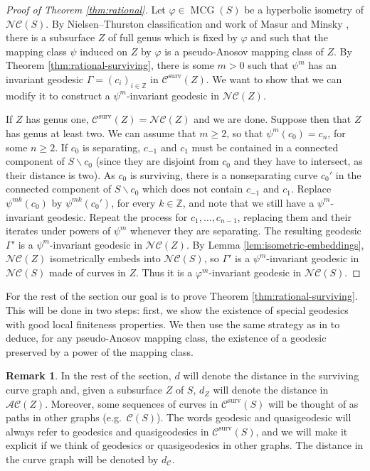 \documentclass{amsart}
\newcommand{\Z}{\mathbb{Z}}
\newcommand{\C}{\mathcal{C}}
\newcommand{\NC}{\mathcal{NC}}
\DeclareMathOperator{\mcg}{MCG}
\newcommand{\ssm}{\smallsetminus}
\newcommand{\dist}{d}
\newcommand{\Csurv}{\C^{\text{surv}}}
\newcommand{\AC}{\mathcal{AC}}
\theoremstyle{definition}
\newtheorem{rmk}[thm]{Remark}
\begin{document}
\begin{proof}[Proof of Theorem \ref{thm:rational}]
Let \(\varphi\in \mcg(S)\) be a hyperbolic isometry of \(\NC(S)\). By Nielsen--Thurston classification and work of Masur and Minsky \cite{mm_geometryI}, there is a subsurface \(Z\) of full genus which is fixed by \(\varphi\) and such that the mapping class \(\psi\) induced on \(Z\) by \(\varphi\) is a pseudo-Anosov mapping class of \(Z\). By Theorem \ref{thm:rational-surviving}, there is some \(m>0\) such that \(\psi^m\) has an invariant geodesic \(\Gamma=(c_i)_{i\in\Z}\) in \(\Csurv(Z)\). We want to show that we can modify it to construct a \(\psi^m\)-invariant geodesic in \(\NC(Z)\). 

If \(Z\) has genus one, \(\Csurv(Z)=\NC(Z)\) and we are done. Suppose then that \(Z\) has genus at least two. We can assume that \(m\geq 2\), so that \(\psi^m(c_0)=c_n\), for some \(n\geq 2\). If \(c_0\) is separating, \(c_{-1}\) and \(c_1\) must be contained in a connected component of \(S\ssm c_0\) (since they are disjoint from \(c_0\) and they have to intersect, as their distance is two). As \(c_0\) is surviving, there is a nonseparating curve \(c_0'\) in the connected component of \(S\ssm c_0\) which does not contain \(c_{-1}\) and \(c_1\). Replace \(\psi^{mk}(c_0)\) by \(\psi^{mk}(c_0')\), for every \(k\in\Z\), and note that we still have a \(\psi^m\)-invariant geodesic. Repeat the process for \(c_1,\dots, c_{n-1}\), replacing them and their iterates under powers of \(\psi^m\) whenever they are separating. The resulting geodesic \(\Gamma'\) is a \(\psi^m\)-invariant geodesic in \(\NC(Z)\). By Lemma \ref{lem:isometric-embeddings}, \(\NC(Z)\) isometrically embeds into \(\NC(S)\), so \(\Gamma'\) is a \(\psi^m\)-invariant geodesic in \(\NC(S)\) made of curves in \(Z\). Thus it is a \(\varphi^m\)-invariant geodesic in \(\NC(S)\).
\end{proof}

For the rest of the section our goal is to prove Theorem \ref{thm:rational-surviving}. This will be done in two steps: first, we show the existence of special geodesics with good local finiteness properties. We then use the same strategy as in \cite{bowditch_tight} to deduce, for any pseudo-Anosov mapping class, the existence of a geodesic preserved by a power of the mapping class.

\begin{rmk} In the rest of the section, \(\dist\) will denote the distance in the surviving curve graph and, given a subsurface \(Z\) of \(S\), \(\dist_Z\) will denote the distance in \(\AC(Z)\). Moreover, some sequences of curves in \(\Csurv(S)\) will be thought of as paths in other graphs (e.g.\ \(\C(S)\)). The words geodesic and quasigeodesic will always refer to geodesics and quasigeodesics in \(\Csurv(S)\), and we will make it explicit if we think of geodesics or quasigeodesics in other graphs. The distance in the curve graph will be denoted by $d_\C$.
\end{rmk}
\end{document}
